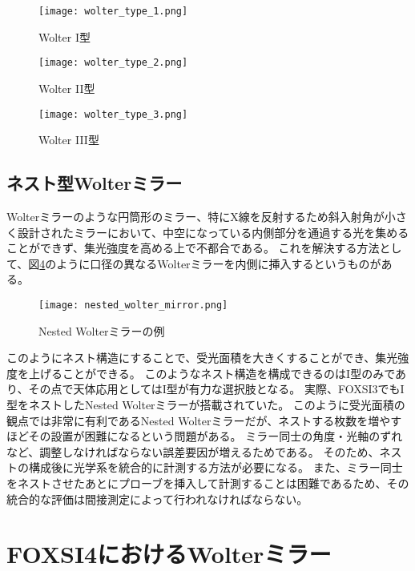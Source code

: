 \begin{figure}[b]
\centering
\texttt{[image: wolter\_type\_1.png]}
\caption{Wolter I型}
\label{fig:wolter_type_1}
\end{figure}

\begin{figure}[b]
\centering
\texttt{[image: wolter\_type\_2.png]}
\caption{Wolter II型}
\label{fig:wolter_type_2}
\end{figure}

\begin{figure}[b]
\centering
\texttt{[image: wolter\_type\_3.png]}
\caption{Wolter III型}
\label{fig:wolter_type_3}
\end{figure}

\subsection{ネスト型Wolterミラー}
\label{chap1_nested_wolter_mirror}

Wolterミラーのような円筒形のミラー、特にX線を反射するため斜入射角が小さく設計されたミラーにおいて、中空になっている内側部分を通過する光を集めることができず、集光強度を高める上で不都合である。
これを解決する方法として、図\ref{fig:nested_wolter_mirror}のように口径の異なるWolterミラーを内側に挿入するというものがある。\cite{BuitragoCasas2017}

\begin{figure}[b]
\centering
\texttt{[image: nested\_wolter\_mirror.png]}
\caption{Nested Wolterミラーの例}
\label{fig:nested_wolter_mirror}
\end{figure}

このようにネスト構造にすることで、受光面積を大きくすることができ、集光強度を上げることができる。
このようなネスト構造を構成できるのはI型のみであり、その点で天体応用としてはI型が有力な選択肢となる。
実際、FOXSI3でもI型をネストしたNested Wolterミラーが搭載されていた。
このように受光面積の観点では非常に有利であるNested Wolterミラーだが、ネストする枚数を増やすほどその設置が困難になるという問題がある。
ミラー同士の角度・光軸のずれなど、調整しなければならない誤差要因が増えるためである。
そのため、ネストの構成後に光学系を統合的に計測する方法が必要になる。
また、ミラー同士をネストさせたあとにプローブを挿入して計測することは困難であるため、その統合的な評価は間接測定によって行われなければならない。

\newpage
\section{FOXSI4におけるWolterミラー}
\label{chap1_background}

